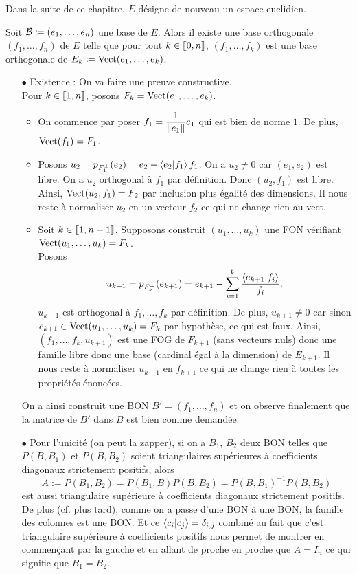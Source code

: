 \documentclass{magnolia}
\begin{document}
Dans la suite de ce chapitre, $E$ désigne de nouveau un espace euclidien.\\

\begin{proposition}[nom={Algorithme d'orthogonalisation de \nom{Gram-Schmidt}}]
Soit $\mathcal{B}\coloneqq(e_1,\ldots,e_n)$ une base de $E$. Alors il existe une base
orthogonale $(f_1,\ldots,f_n)$ de $E$ telle que pour tout
$k\in\left\llbracket 0,n\right\rrbracket$,
$(f_1,\ldots,f_k)$ est une base orthogonale de $E_k\coloneqq\operatorname{Vect}(e_1,\ldots,e_k)$.
\end{proposition}

\begin{preuve}
\begin{itemize}
\item[$\bullet$] Existence : On va faire une preuve constructive.\\
Pour $k\in \left\llbracket 1,n\right\rrbracket$, posons $F_k=\operatorname{Vect}(e_1,\ldots,e_k)$.
\begin{itemize}
\item On commence par poser $f_1=\dfrac{1}{\left\|e_1\right\|}e_1$ qui est bien de norme $1$. De plus, $\operatorname{Vect}(f_1)=F_1$.
\item Posons $u_2=p_{F_1^\perp}(e_2)=e_2-\left\langle {e_2}\middle|{f_1}\right\rangle f_1$. On a $u_2\neq 0$ car $(e_1,e_2)$ est libre. On a $u_2$ orthogonal à $f_1$ par définition. Donc $(u_2,f_1)$ est libre. Ainsi, $\operatorname{Vect}(u_2,f_1)=F_2$ par inclusion plus égalité des dimensions. Il nous reste à normaliser $u_2$ en un vecteur $f_2$ ce qui ne change rien au vect.
\item Soit $k\in \left\llbracket 1,n-1\right\rrbracket$. Supposons construit $(u_1,\ldots,u_k)$ une FON vérifiant $\operatorname{Vect}(u_1,\ldots,u_k)=F_k$.\\
Posons $$u_{k+1}=p_{F_k^\perp}(e_{k+1})=e_{k+1}-\sum_{i=1}^k\dfrac{\left\langle {e_{k+1}}\middle|{f_i}\right\rangle}{f_i}.$$
$u_{k+1}$ est orthogonal à $f_1,\ldots,f_k$ par définition. De plus, $u_{k+1}\neq 0$ car sinon $e_{k+1}\in \operatorname{Vect}(u_1,\ldots,u_k)=F_k$ par hypothèse, ce qui est faux. Ainsi, $(f_1,\ldots,f_k,u_{k+1})$ est une FOG de $F_{k+1}$ (sans vecteurs nuls) donc une famille libre donc une base (cardinal égal à la dimension) de $E_{k+1}$. Il nous reste à normaliser $u_{k+1}$ en $f_{k+1}$ ce qui ne change rien à toutes les propriétés énoncées. 
\end{itemize}
On a ainsi construit une BON $B'=(f_1,\ldots, f_n)$ et on observe finalement que la matrice de $B'$ dans $B$ est bien comme demandée.
\item[$\bullet$] Pour l'unicité (on peut la zapper), si on a $B_1$, $B_2$ deux BON telles que $P(B,B_1)$ et $P(B,B_2)$ soient triangulaires supérieures à coefficients diagonaux strictement positifs, alors $$A:=P(B_1,B_2)=P(B_1,B)P(B,B_2)=P(B,B_1)^{-1}P(B,B_2)$$ est aussi triangulaire supérieure à coefficients diagonaux strictement positifs. De plus (cf. plus tard), comme on a passe d'une BON à une BON, la famille des colonnes est une BON. Et ce $\left\langle {c_i}\middle|{c_j}\right\rangle=\delta_{i,j}$ combiné au fait que c'est triangulaire supérieure à coefficients positifs nous permet de montrer en commençant par la gauche et en allant de proche en proche que $A=I_n$ ce qui signifie que $B_1=B_2$.
\end{itemize}
\end{preuve}
\end{document}
